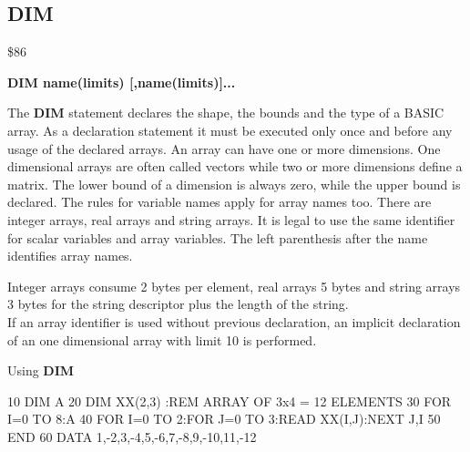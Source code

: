 
\newpage
\subsection{DIM}
\begin{description}[leftmargin=3cm,style=nextline]
\item [Token:] \$86
\item [Format:] {\bf DIM name(limits) [,name(limits)]...}
\item [Usage:] The {\bf DIM} statement declares the shape,
               the bounds and the type of a BASIC array.
               As a declaration statement it must be executed
               only once and before any usage of the declared arrays.
               An array can have one or more dimensions.
               One dimensional arrays are often called vectors
               while two or more dimensions define a matrix.
               The lower bound of a dimension is always zero,
               while the upper bound is declared. The rules for
               variable names apply for array names too.
               There are integer arrays, real arrays and string arrays.
               It is legal to use the same identifier for scalar
               variables and array variables. The left parenthesis
               after the name identifies array names.

\item [Remarks:] Integer arrays consume 2 bytes per element,
                 real arrays 5 bytes and string arrays 3 bytes
                 for the string descriptor plus
                 the length of the string. \\
                 If an array identifier is used without previous
                 declaration, an implicit declaration of an
                 one dimensional array with limit 10 is performed.

\item [Example:] Using {\bf DIM}
\begin{screenoutput}
10 DIM A%
20 DIM XX(2,3) :REM ARRAY OF 3x4 = 12 ELEMENTS
30 FOR I=0 TO 8:A%
40 FOR I=0 TO 2:FOR J=0 TO 3:READ XX(I,J):NEXT J,I
50 END
60 DATA 1,-2,3,-4,5,-6,7,-8,9,-10,11,-12
\end{screenoutput}
\end{description}


\newpage
